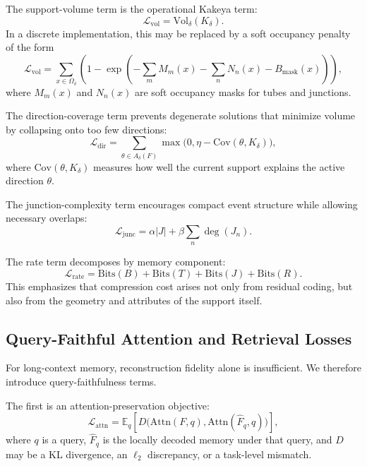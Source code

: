 \documentclass[11pt]{article}
\begin{document}
The support-volume term is the operational Kakeya term:
\begin{equation}
\mathcal{L}_{\mathrm{vol}}=\mathrm{Vol}_\delta(K_\delta).
\end{equation}
In a discrete implementation, this may be replaced by a soft occupancy penalty of the form
\begin{equation}
\mathcal{L}_{\mathrm{vol}}
=
\sum_{x\in \Omega_\delta}
\left(
1-\exp\left(
-\sum_m M_m(x)-\sum_n N_n(x)-B_{\mathrm{mask}}(x)
\right)
\right),
\end{equation}
where $M_m(x)$ and $N_n(x)$ are soft occupancy masks for tubes and junctions.

The direction-coverage term prevents degenerate solutions that minimize volume by collapsing onto too few directions:
\begin{equation}
\mathcal{L}_{\mathrm{dir}}
=
\sum_{\theta\in A_\delta(F)}
\max\bigl(0,\eta-\mathrm{Cov}(\theta,K_\delta)\bigr),
\end{equation}
where $\mathrm{Cov}(\theta,K_\delta)$ measures how well the current support explains the active direction $\theta$.

The junction-complexity term encourages compact event structure while allowing necessary overlaps:
\begin{equation}
\mathcal{L}_{\mathrm{junc}}=\alpha |J| + \beta \sum_n \deg(J_n).
\end{equation}

The rate term decomposes by memory component:
\begin{equation}
\mathcal{L}_{\mathrm{rate}}
=
\mathrm{Bits}(B)+\mathrm{Bits}(T)+\mathrm{Bits}(J)+\mathrm{Bits}(R).
\end{equation}
This emphasizes that compression cost arises not only from residual coding, but also from the geometry and attributes of the support itself.

\subsection{Query-Faithful Attention and Retrieval Losses}
For long-context memory, reconstruction fidelity alone is insufficient. We therefore introduce query-faithfulness terms.

The first is an attention-preservation objective:
\begin{equation}
\mathcal{L}_{\mathrm{attn}}
=
\mathbb{E}_{q}
\left[
D\bigl(\mathrm{Attn}(F,q),\mathrm{Attn}(\hat F_q,q)\bigr)
\right],
\end{equation}
where $q$ is a query, $\hat F_q$ is the locally decoded memory under that query, and $D$ may be a KL divergence, an $\ell_2$ discrepancy, or a task-level mismatch.
\end{document}
